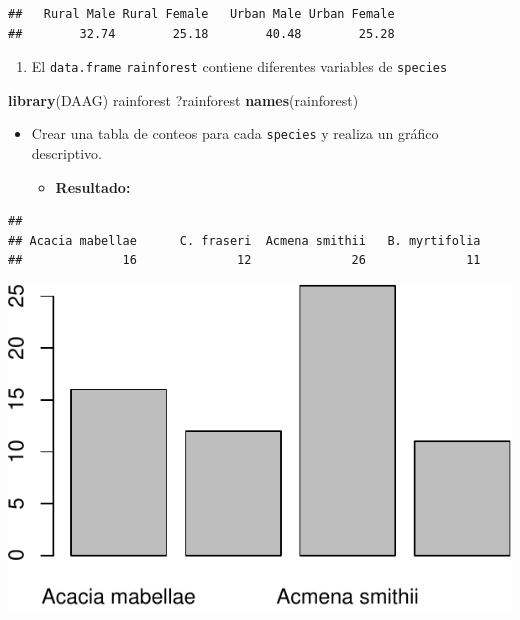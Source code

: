 \documentclass[]{article}
\def\tightlist{}
\newenvironment{Shaded}{\begin{snugshade}}{\end{snugshade}}
\newcommand{\KeywordTok}[1]{\textcolor[rgb]{0.13,0.29,0.53}{\textbf{{#1}}}}
\newcommand{\NormalTok}[1]{{#1}}
\numberwithin{equation}{section}
\begin{document}
\begin{verbatim}
##   Rural Male Rural Female   Urban Male Urban Female 
##        32.74        25.18        40.48        25.28
\end{verbatim}

\begin{enumerate}
\def\labelenumi{\arabic{enumi}.}
\setcounter{enumi}{1}
\tightlist
\item
  El \texttt{data.frame} \texttt{rainforest} contiene diferentes
  variables de \texttt{species}
\end{enumerate}

\begin{Shaded}
\begin{Highlighting}[]
\KeywordTok{library}\NormalTok{(DAAG)}
\NormalTok{rainforest}
\NormalTok{?rainforest}
\KeywordTok{names}\NormalTok{(rainforest)}
\end{Highlighting}
\end{Shaded}

\begin{itemize}
\item
  Crear una tabla de conteos para cada \texttt{species} y realiza un
  gráfico descriptivo.

  \begin{itemize}
  \tightlist
  \item
    \textbf{Resultado:}
  \end{itemize}
\end{itemize}

\begin{verbatim}
## 
## Acacia mabellae      C. fraseri  Acmena smithii   B. myrtifolia 
##              16              12              26              11
\end{verbatim}

\includegraphics{tema1_files/figure-latex/unnamed-chunk-71-1.pdf}
\end{document}
